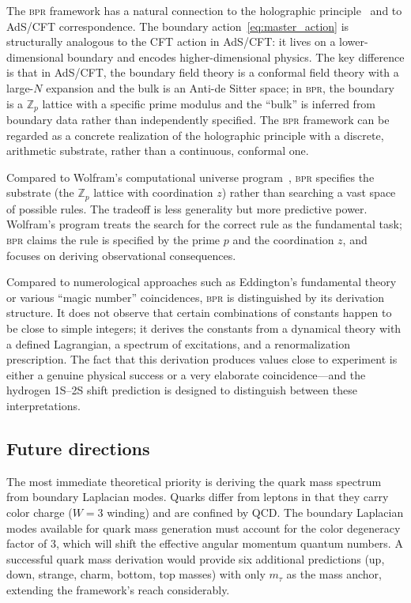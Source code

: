 \documentclass[aps,prd,twocolumn,superscriptaddress,longbibliography,nofootinbib]{revtex4-2}
\newcommand{\Zp}{\mathbb{Z}_p}
\newcommand{\bpr}{\textsc{bpr}}
\begin{document}
The \bpr{} framework has a natural connection to the holographic
principle~\cite{tHooft1993,Susskind1995} and to AdS/CFT
correspondence.  The boundary action~\eqref{eq:master_action} is
structurally analogous to the CFT action in AdS/CFT: it lives on a
lower-dimensional boundary and encodes higher-dimensional physics.
The key difference is that in AdS/CFT, the boundary field theory is
a conformal field theory with a large-$N$ expansion and the bulk is
an Anti-de Sitter space; in \bpr{}, the boundary is a $\Zp$ lattice
with a specific prime modulus and the ``bulk'' is inferred from
boundary data rather than independently specified.  The \bpr{}
framework can be regarded as a concrete realization of the
holographic principle with a discrete, arithmetic substrate, rather
than a continuous, conformal one.

Compared to Wolfram's computational universe
program~\cite{Wolfram2020}, \bpr{} specifies the substrate (the
$\Zp$ lattice with coordination $z$) rather than searching a vast
space of possible rules.  The tradeoff is less generality but more
predictive power.  Wolfram's program treats the search for the
correct rule as the fundamental task; \bpr{} claims the rule is
specified by the prime $p$ and the coordination $z$, and focuses on
deriving observational consequences.

Compared to numerological approaches such as Eddington's fundamental
theory or various ``magic number'' coincidences, \bpr{} is
distinguished by its derivation structure.  It does not observe that
certain combinations of constants happen to be close to simple
integers; it derives the constants from a dynamical theory with a
defined Lagrangian, a spectrum of excitations, and a renormalization
prescription.  The fact that this derivation produces values close
to experiment is either a genuine physical success or a very
elaborate coincidence---and the hydrogen 1S--2S shift prediction is
designed to distinguish between these interpretations.

\subsection{Future directions}

The most immediate theoretical priority is deriving the quark mass
spectrum from boundary Laplacian modes.  Quarks differ from leptons
in that they carry color charge ($W = 3$ winding) and are confined
by QCD.  The boundary Laplacian modes available for quark mass
generation must account for the color degeneracy factor of 3, which
will shift the effective angular momentum quantum numbers.  A
successful quark mass derivation would provide six additional
predictions (up, down, strange, charm, bottom, top masses) with
only $m_\tau$ as the mass anchor, extending the framework's reach
considerably.
\end{document}

